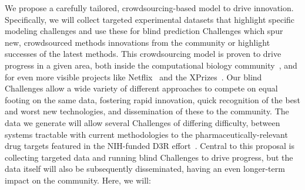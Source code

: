 \documentclass[11pt]{article}
\begin{document}
We propose a carefully tailored, crowdsourcing-based model to drive innovation. 
Specifically, we will collect targeted experimental datasets that highlight specific modeling challenges and use these for blind prediction Challenges which spur new, crowdsourced methods innovations from the community or highlight successes of the latest methods.
This crowdsourcing model is proven to drive progress in a given area, both inside the computational biology community~\cite{Moult:2014:Proteins, Monastyrskyy:2016:Proteins, Moult:2016:Proteins, Prill:2011:Sci.Signal., Eisenstein:2013:NatBiotech, Saez-Rodriguez:2016:NatRevGenet}, and for even more visible projects like Netflix~\cite{Bell:2010:CHANCE} and the XPrizes~\cite{::XPRIZE, Kay:2011:R&DManage, XPrize:2017:Wikipedia}. 
Our blind Challenges allow a wide variety of different approaches to compete on equal footing on the same data, fostering rapid innovation, quick recognition of the best and worst new technologies, and dissemination of these to the community. 
The data we generate will allow several Challenges of differing difficulty, between systems tractable with current methodologies to the pharmaceutically-relevant drug targets featured in the NIH-funded D3R effort~\cite{Gathiaka:2016:JComputAidedMolDes}.
Central to this proposal is collecting targeted data and running blind Challenges to drive progress, but the data itself will also be subsequently disseminated, having an even longer-term impact on the community.
Here, we will:
\end{document}
